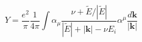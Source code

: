 \begin{equation}
\label{eq1}
Y = \frac{e^2}\pi \frac 1{4\pi}
\int\alpha_\mu
\frac{\nu + \tilde{E}/|\tilde{E}|}{|\tilde{E}|+|{\bm k}|-\nu E_i}
\alpha^\mu \frac{d{\bm k}}{|{\bm k}|}
\end{equation}

